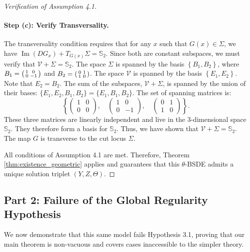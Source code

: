 \documentclass[12pt, letterpaper]{amsart}
\DeclareMathOperator{\Image}{Im}
\theoremstyle{plain}
\theoremstyle{definition}
\theoremstyle{remark}
\numberwithin{equation}{section} %
\begin{document}
\begin{appendices}
\begin{proof}[Verification of Assumption 4.1]
\begin{enumerate}[label=(\roman*)]
    \paragraph{Step (c): Verify Transversality.}
    The transversality condition requires that for any $x$ such that $G(x) \in \Sigma$, we have $\Image(DG_x) + T_{G(x)}\Sigma = \mathbb{S}_2$. Since both are constant subspaces, we must verify that $\mathcal{V} + \Sigma = \mathbb{S}_2$.
    The space $\Sigma$ is spanned by the basis $\left\{ B_1, B_2 \right\}$, where $B_1 = \begin{psmallmatrix} 1 & 0 \\ 0 & -1 \end{psmallmatrix}$ and $B_2 = \begin{psmallmatrix} 0 & 1 \\ 1 & 0 \end{psmallmatrix}$.
    The space $\mathcal{V}$ is spanned by the basis $\left\{ E_1, E_2 \right\}$. Note that $E_2 = B_2$.
    The sum of the subspaces, $\mathcal{V} + \Sigma$, is spanned by the union of their bases: $\{E_1, E_2, B_1, B_2\} = \{E_1, B_1, B_2\}$.
    The set of spanning matrices is:
    \[ \left\{ \begin{pmatrix} 1 & 0 \\ 0 & 0 \end{pmatrix}, \quad \begin{pmatrix} 1 & 0 \\ 0 & -1 \end{pmatrix}, \quad \begin{pmatrix} 0 & 1 \\ 1 & 0 \end{pmatrix} \right\}. \]
    These three matrices are linearly independent and live in the 3-dimensional space $\mathbb{S}_2$. They therefore form a basis for $\mathbb{S}_2$. Thus, we have shown that $\mathcal{V} + \Sigma = \mathbb{S}_2$. The map $G$ is transverse to the cut locus $\Sigma$.
\end{enumerate}
All conditions of Assumption 4.1 are met. Therefore, Theorem \ref{thm:existence_geometric} applies and guarantees that this \(\theta\)-BSDE admits a unique solution triplet $(Y,Z,\Theta)$.
\end{proof}

\subsection{Part 2: Failure of the Global Regularity Hypothesis}
We now demonstrate that this same model fails Hypothesis 3.1, proving that our main theorem is non-vacuous and covers cases inaccessible to the simpler theory.


\end{appendices}
\end{document}
